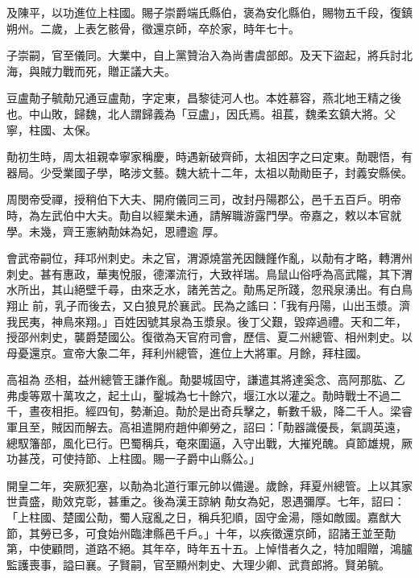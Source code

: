 \begin{pinyinscope}
 及陳平，以功進位上柱國。賜子崇爵端氏縣伯，褒為安化縣伯，賜物五千段，復鎮朔州。二歲，上表乞骸骨，徵還京師，卒於家，時年七十。



 子崇嗣，官至儀同。大業中，自上黨贊治入為尚書虞部郎。及天下盜起，將兵討北海，與賊力戰而死，贈正議大夫。



 豆盧勣子毓勣兄通豆盧勣，字定東，昌黎徒河人也。本姓慕容，燕北地王精之後也。中山敗，歸魏，北人謂歸義為「豆盧」，因氏焉。祖萇，魏柔玄鎮大將。父寧，柱國、太保。



 勣初生時，周太祖親幸寧家稱慶，時遇新破齊師，太祖因字之曰定東。勣聰悟，有器局。少受業國子學，略涉文藝。魏大統十二年，太祖以勣勛臣子，封義安縣侯。



 周閔帝受禪，授稍伯下大夫、開府儀同三司，改封丹陽郡公，邑千五百戶。明帝時，為左武伯中大夫。勣自以經業未通，請解職游露門學。帝嘉之，敕以本官就學。未幾，齊王憲納勣妹為妃，恩禮逾
 厚。



 會武帝嗣位，拜邛州刺史。未之官，渭源燒當羌因饑饉作亂，以勣有才略，轉渭州刺史。甚有惠政，華夷悅服，德澤流行，大致祥瑞。鳥鼠山俗呼為高武隴，其下渭水所出，其山絕壁千尋，由來乏水，諸羌苦之。勣馬足所踐，忽飛泉湧出。有白鳥翔止前，乳子而後去，又白狼見於襄武。民為之謠曰：「我有丹陽，山出玉漿。濟我民夷，神鳥來翔。」百姓因號其泉為玉漿泉。後丁父艱，毀瘁過禮。天和二年，授邵州刺史，襲爵楚國公。復徵為天官府司會，歷信、夏二州總管、相州刺史。以母憂還京。宣帝大象二年，拜利州總管，進位上大將軍。月餘，拜柱國。



 高祖為
 丞相，益州總管王謙作亂。勣嬰城固守，謙遣其將達奚念、高阿那肱、乙弗虔等眾十萬攻之，起土山，鑿城為七十餘穴，堰江水以灌之。勣時戰士不過二千，晝夜相拒。經四旬，勢漸迫。勣於是出奇兵擊之，斬數千級，降二千人。梁睿軍且至，賊因而解去。高祖遣開府趙仲卿勞之，詔曰：「勣器識優長，氣調英遠，總馭籓部，風化已行。巴蜀稱兵，奄來圍逼，入守出戰，大摧兇醜。貞節雄規，厥功甚茂，可使持節、上柱國。賜一子爵中山縣公。」



 開皇二年，突厥犯塞，以勣為北道行軍元帥以備邊。歲餘，拜夏州總管。上以其家世貴盛，勛效克彰，甚重之。後為漢王諒納
 勣女為妃，恩遇彌厚。七年，詔曰：「上柱國、楚國公勣，蜀人寇亂之日，稱兵犯順，固守金湯，隱如敵國。嘉猷大節，其勞已多，可食始州臨津縣邑千戶。」十年，以疾徵還京師，詔諸王並至勣第，中使顧問，道路不絕。其年卒，時年五十五。上悼惜者久之，特加賵贈，鴻臚監護喪事，謚曰襄。子賢嗣，官至顯州刺史、大理少卿、武賁郎將。賢弟毓。




\end{pinyinscope}
